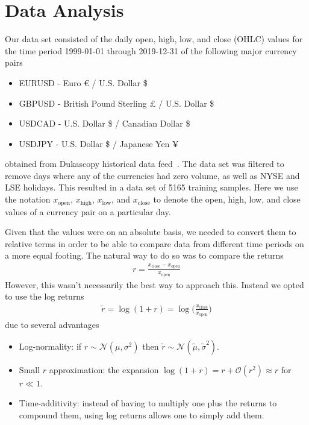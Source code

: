 \section{Data Analysis}
Our data set consisted of the daily open, high, low, and close (OHLC) values for the time period 1999-01-01 through 2019-12-31 of the following major currency pairs
\begin{itemize}
    \item EURUSD - Euro € / U.S. Dollar \$
    \item GBPUSD - British Pound Sterling £ / U.S. Dollar \$
    \item USDCAD - U.S. Dollar \$ / Canadian Dollar \$
    \item USDJPY - U.S. Dollar \$ / Japanese Yen ¥
\end{itemize}
obtained from Dukascopy historical data feed~\cite{dukascopy}.
The data set was filtered to remove days where any of the currencies had zero volume, as well as NYSE and LSE holidays.
This resulted in a data set of 5165 training samples.
Here we use the notation \( x_\text{open} \), \( x_\text{high} \), \( x_\text{low} \), and \( x_\text{close} \) to denote the open, high, low, and close values of a currency pair on a particular day.

Given that the values were on an absolute basis, we needed to convert them to relative terms in order to be able to compare data from different time periods on a more equal footing.
The natural way to do so was to compare the returns
\begin{align}
    r = \frac{x_\text{close} - x_\text{open}}{x_\text{open}}
\end{align}
However, this wasn't necessarily the best way to approach this.
Instead we opted to use the log returns
\begin{align}
    \tilde{r}
        = \log(1+r)
        = \log\bigg( \frac{x_\text{close}}{x_\text{open}} \bigg)
\end{align}
due to several advantages~\cite{quantivity_2012}
\begin{itemize}
    \item Log-normality: if \( r \sim \mathcal{N}(\mu, \sigma^2) \) then \( \tilde{r} \sim \mathcal{N}(\tilde{\mu}, \tilde{\sigma}^2) \).
    \item Small \( r \) approximation: the expansion \( \log (1 + r) = r + \mathcal{O}(r^2) \approx r \) for \( r \ll 1 \).
    \item Time-additivity: instead of having to multiply one plus the returns to compound them, using log returns allows one to simply add them.
\end{itemize}

